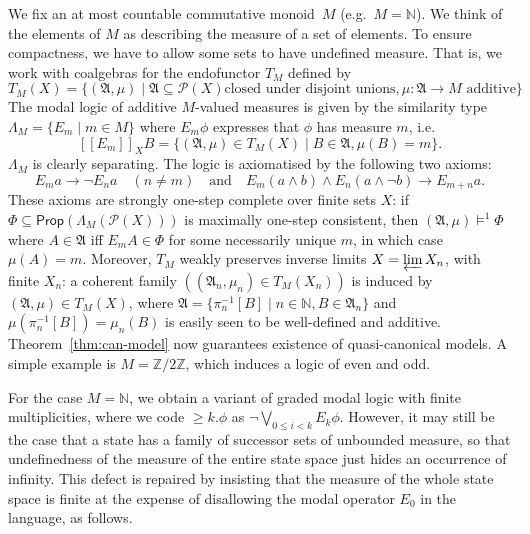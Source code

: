 \documentclass[proceedings]{stacs}
\theoremstyle{definition}
\theoremstyle{plain}
\newcommand{\Pow}{\mathcal{P}}
\newcommand{\Sem}[1]{{[\![#1]\!]}}
\newcommand{\modimpl}{\to}
\newcommand{\Nat}{{\mathbb{N}}}
\newcommand{\Int}{{\mathbb{Z}}}
\newcommand{\Prop}{\mathsf{Prop}}
\newcommand{\invlim}{\varprojlim}
\newcommand{\modelsOS}{\models^1}
\newcommand{\FA}{\mathfrak{A}}
\newcommand{\Lor}{\bigvee}
\begin{document}
\begin{exa}
\label{expl:additive-measures}
We fix an at most countable commutative monoid~$M$ (e.g.\
$M=\Nat$). We think of the elements of $M$ as describing the measure
of a set of elements. To ensure compactness, we have to allow some
sets to have undefined measure. That is, we work with coalgebras for
the endofunctor $T_M$ defined by
\[ T_M(X) = \lbrace (\FA, \mu) \mid \FA \subseteq \Pow(X) \mbox{
  closed under disjoint unions}, \mu: \FA \to M \mbox{ additive}
\rbrace \] 
The modal logic of additive $M$-valued measures is given by the
similarity type $\Lambda_M = \lbrace E_m \mid m \in M \rbrace$ where
$E_m \phi$ expresses that $\phi$ has measure $m$, i.e.\
\begin{equation*}
  \Sem{E_m}_XB=\{(\FA,\mu)\in T_M(X)\mid B\in\FA,\mu(B)=m\}.
\end{equation*}
$\Lambda_M$ is clearly separating. The logic is axiomatised by the
following two axioms:
\begin{equation*}
 E_ma\modimpl\neg E_na\quad(n\neq m) 
\quad\textrm{and}\quad
 E_m(a\land b)\land E_n(a\land\neg b)\modimpl E_{m+n}a.
\end{equation*}
These axioms are strongly one-step complete over finite sets $X$: if
$\Phi\subseteq\Prop(\Lambda_M(\Pow(X)))$ is maximally one-step
consistent, then $(\FA,\mu)\modelsOS\Phi$ where $A\in\FA$ iff
$E_mA\in\Phi$ for some necessarily unique $m$, in which case
$\mu(A)=m$. Moreover, $T_M$ weakly preserves inverse limits
$X=\invlim X_n$, with finite $X_n$: a coherent family
$((\FA_n,\mu_n)\in T_M(X_n))$ is induced by
$(\FA,\mu)\in T_M(X)$, where $\FA=\{\pi_n^{-1}[B]\mid
n\in\Nat,B\in\FA_n\}$ and $\mu(\pi_n^{-1}[B])=\mu_n(B)$ is easily seen
to be well-defined and additive. Theorem~\ref{thm:can-model} now
guarantees existence of quasi-canonical models. A simple example is $M
= \Int / 2 \Int$, which induces a logic of even and odd.

For the case $M = \Nat$, we obtain a variant of graded modal logic
with finite multiplicities, where we code $\geq k. \phi$ as $\neg
\Lor_{0 \leq i < k} E_k \phi$. However, it may still be the case that
a state has a family of successor sets of unbounded measure, so that
undefinedness of the measure of the entire state space just hides an
occurrence of infinity. This defect is repaired by insisting that the
measure of the whole state space is finite at the expense of
disallowing the modal operator $E_0$ in the language, as follows.
\end{exa}
\end{document}
